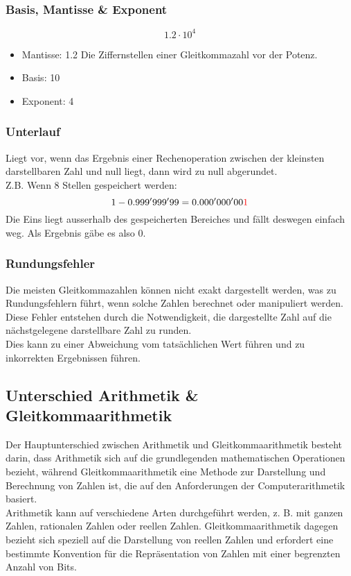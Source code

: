 \subsubsection{Basis, Mantisse \& Exponent}
\begin{displaymath}
	1.2 \cdot 10^4
\end{displaymath}
\begin{itemize}
	\item Mantisse: 1.2 \newline
	Die Ziffernstellen einer Gleitkommazahl vor der Potenz.
	\item Basis: 10
	\item Exponent: 4
\end{itemize}
\subsubsection{Unterlauf} 
Liegt vor, wenn das Ergebnis einer Rechenoperation zwischen der kleinsten darstellbaren Zahl und null liegt, dann wird zu null abgerundet. \\
Z.B. Wenn 8 Stellen gespeichert werden:
\begin{displaymath}
	1-0.999'999'99 = 0.000'000'00 {\color{red} 1}
\end{displaymath}
Die Eins liegt ausserhalb des gespeicherten Bereiches und fällt deswegen einfach weg. Als Ergebnis gäbe es also  0.

\subsubsection{Rundungsfehler}
Die meisten Gleitkommazahlen können nicht exakt dargestellt werden, was zu Rundungsfehlern führt, wenn solche Zahlen berechnet oder manipuliert werden. Diese Fehler entstehen durch die Notwendigkeit, die dargestellte Zahl auf die nächstgelegene darstellbare Zahl zu runden. \\
Dies kann zu einer Abweichung vom tatsächlichen Wert führen und zu inkorrekten Ergebnissen führen.



\subsection{Unterschied Arithmetik \& Gleitkommaarithmetik}
Der Hauptunterschied zwischen Arithmetik und Gleitkommaarithmetik besteht darin, dass Arithmetik sich auf die grundlegenden mathematischen Operationen bezieht, während Gleitkommaarithmetik eine Methode zur Darstellung und Berechnung von Zahlen ist, die auf den Anforderungen der Computerarithmetik basiert.  \\
Arithmetik kann auf verschiedene Arten durchgeführt werden, z. B. mit ganzen Zahlen, rationalen Zahlen oder reellen Zahlen. Gleitkommaarithmetik dagegen bezieht sich speziell auf die Darstellung von reellen Zahlen und erfordert eine bestimmte Konvention für die Repräsentation von Zahlen mit einer begrenzten Anzahl von Bits.

